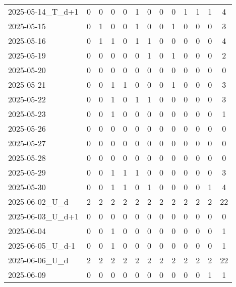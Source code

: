 \documentclass[dvipdfmx,oneside]{article}
\begin{document}
\begin{longtable}{lcccccccccccc}
2025-05-14\_T\_d+1 & 0 & 0 & 0 & 0 & 1 & 0 & 0 & 0 & 1 & 1 & 1 & 4 \\
2025-05-15 & 0 & 1 & 0 & 0 & 1 & 0 & 0 & 1 & 0 & 0 & 0 & 3 \\
2025-05-16 & 0 & 1 & 1 & 0 & 1 & 1 & 0 & 0 & 0 & 0 & 0 & 4 \\
2025-05-19 & 0 & 0 & 0 & 0 & 0 & 1 & 0 & 1 & 0 & 0 & 0 & 2 \\
2025-05-20 & 0 & 0 & 0 & 0 & 0 & 0 & 0 & 0 & 0 & 0 & 0 & 0 \\
2025-05-21 & 0 & 0 & 1 & 1 & 0 & 0 & 0 & 1 & 0 & 0 & 0 & 3 \\
2025-05-22 & 0 & 0 & 1 & 0 & 1 & 1 & 0 & 0 & 0 & 0 & 0 & 3 \\
2025-05-23 & 0 & 0 & 1 & 0 & 0 & 0 & 0 & 0 & 0 & 0 & 0 & 1 \\
2025-05-26 & 0 & 0 & 0 & 0 & 0 & 0 & 0 & 0 & 0 & 0 & 0 & 0 \\
2025-05-27 & 0 & 0 & 0 & 0 & 0 & 0 & 0 & 0 & 0 & 0 & 0 & 0 \\
2025-05-28 & 0 & 0 & 0 & 0 & 0 & 0 & 0 & 0 & 0 & 0 & 0 & 0 \\
2025-05-29 & 0 & 0 & 1 & 1 & 1 & 0 & 0 & 0 & 0 & 0 & 0 & 3 \\
2025-05-30 & 0 & 0 & 1 & 1 & 0 & 1 & 0 & 0 & 0 & 0 & 1 & 4 \\
2025-06-02\_U\_d & 2 & 2 & 2 & 2 & 2 & 2 & 2 & 2 & 2 & 2 & 2 & 22 \\
2025-06-03\_U\_d+1 & 0 & 0 & 0 & 0 & 0 & 0 & 0 & 0 & 0 & 0 & 0 & 0 \\
2025-06-04 & 0 & 0 & 1 & 0 & 0 & 0 & 0 & 0 & 0 & 0 & 0 & 1 \\
2025-06-05\_U\_d-1 & 0 & 0 & 1 & 0 & 0 & 0 & 0 & 0 & 0 & 0 & 0 & 1 \\
2025-06-06\_U\_d & 2 & 2 & 2 & 2 & 2 & 2 & 2 & 2 & 2 & 2 & 2 & 22 \\
2025-06-09 & 0 & 0 & 0 & 0 & 0 & 0 & 0 & 0 & 0 & 0 & 1 & 1 \\
\end{longtable}
\endgroup
\end{document}
